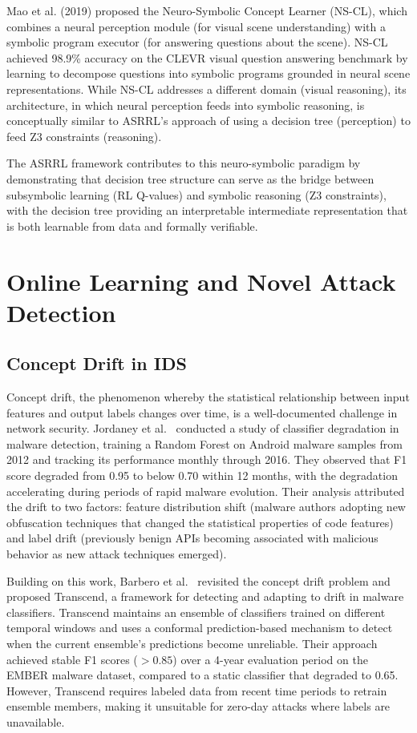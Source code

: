 \documentclass[12pt, letterpaper, oneside]{report}
\newcommand{\ASRRL}{\textsc{ASRRL}}
\begin{document}
Mao et al. (2019) proposed the Neuro-Symbolic Concept Learner (NS-CL), which combines a neural perception module (for visual scene understanding) with a symbolic program executor (for answering questions about the scene). NS-CL achieved 98.9\% accuracy on the CLEVR visual question answering benchmark by learning to decompose questions into symbolic programs grounded in neural scene representations. While NS-CL addresses a different domain (visual reasoning), its architecture, in which neural perception feeds into symbolic reasoning, is conceptually similar to \ASRRL{}'s approach of using a decision tree (perception) to feed Z3 constraints (reasoning).

The \ASRRL{} framework contributes to this neuro-symbolic paradigm by demonstrating that decision tree structure can serve as the bridge between subsymbolic learning (RL Q-values) and symbolic reasoning (Z3 constraints), with the decision tree providing an interpretable intermediate representation that is both learnable from data and formally verifiable.


\section{Online Learning and Novel Attack Detection}
\label{sec:lit_online}

\subsection{Concept Drift in IDS}

Concept drift, the phenomenon whereby the statistical relationship between input features and output labels changes over time, is a well-documented challenge in network security. Jordaney et al.~\cite{jordaney2017} conducted a study of classifier degradation in malware detection, training a Random Forest on Android malware samples from 2012 and tracking its performance monthly through 2016. They observed that F1 score degraded from 0.95 to below 0.70 within 12 months, with the degradation accelerating during periods of rapid malware evolution. Their analysis attributed the drift to two factors: feature distribution shift (malware authors adopting new obfuscation techniques that changed the statistical properties of code features) and label drift (previously benign APIs becoming associated with malicious behavior as new attack techniques emerged).

Building on this work, Barbero et al.~\cite{barbero2022} revisited the concept drift problem and proposed Transcend, a framework for detecting and adapting to drift in malware classifiers. Transcend maintains an ensemble of classifiers trained on different temporal windows and uses a conformal prediction-based mechanism to detect when the current ensemble's predictions become unreliable. Their approach achieved stable F1 scores ($> 0.85$) over a 4-year evaluation period on the EMBER malware dataset, compared to a static classifier that degraded to 0.65. However, Transcend requires labeled data from recent time periods to retrain ensemble members, making it unsuitable for zero-day attacks where labels are unavailable.
\end{document}
